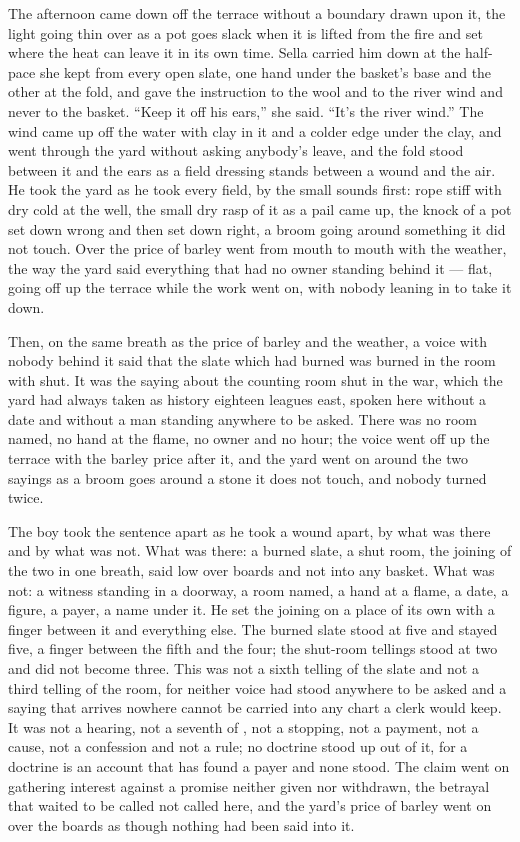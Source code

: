 The afternoon came down off the terrace without a boundary drawn upon it, the light going thin over  as a pot goes slack when it is lifted from the fire and set where the heat can leave it in its own time. Sella carried him down at the half-pace she kept from every open slate, one hand under the basket's base and the other at the fold, and gave the instruction to the wool and to the river wind and never to the basket. “Keep it off his ears,” she said. “It's the river wind.” The wind came up off the water with clay in it and a colder edge under the clay, and went through the yard without asking anybody's leave, and the fold stood between it and the ears as a field dressing stands between a wound and the air. He took the yard as he took every field, by the small sounds first: rope stiff with dry cold at the well, the small dry rasp of it as a pail came up, the knock of a pot set down wrong and then set down right, a broom going around something it did not touch. Over  the price of barley went from mouth to mouth with the weather, the way the yard said everything that had no owner standing behind it --- flat, going off up the terrace while the work went on, with nobody leaning in to take it down.

Then, on the same breath as the price of barley and the weather, a voice with nobody behind it said that the slate which had burned was burned in the room with  shut. It was the  saying about the counting room shut in the war, which the yard had always taken as history eighteen leagues east, spoken here without a date and without a man standing anywhere to be asked. There was no room named, no hand at the flame, no owner and no hour; the voice went off up the terrace with the barley price after it, and the yard went on around the two sayings as a broom goes around a stone it does not touch, and nobody turned twice.

The boy took the sentence apart as he took a wound apart, by what was there and by what was not. What was there: a burned slate, a shut room, the joining of the two in one breath, said low over boards and not into any basket. What was not: a witness standing in a doorway, a room named, a hand at a flame, a date, a figure, a payer, a name under it. He set the joining on a place of its own with a finger between it and everything else. The burned slate stood at five and stayed five, a finger between the fifth and the four; the shut-room tellings stood at two and did not become three. This was not a sixth telling of the slate and not a third telling of the room, for neither voice had stood anywhere to be asked and a saying that arrives nowhere cannot be carried into any chart a clerk would keep. It was not a hearing, not a seventh of , not a stopping, not a payment, not a cause, not a confession and not a rule; no doctrine stood up out of it, for a doctrine is an account that has found a payer and none stood. The claim went on gathering interest against a promise neither given nor withdrawn, the betrayal that waited to be called not called here, and the yard's price of barley went on over the boards as though nothing had been said into it.

